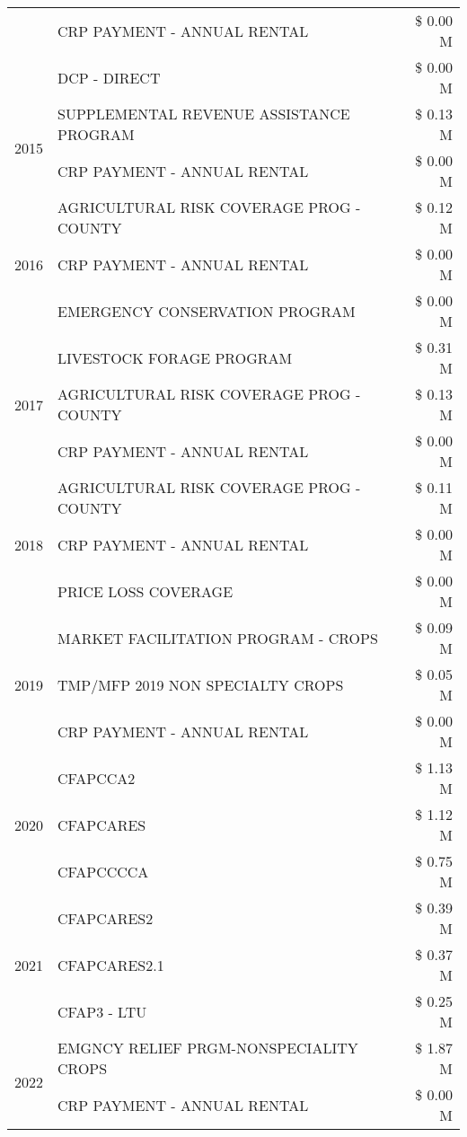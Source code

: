 \begin{tabular}{llr}
 & CRP PAYMENT - ANNUAL RENTAL & \$ 0.00 M \\
 & DCP - DIRECT & \$ 0.00 M \\
\cline{1-3}
\multirow[t]{2}{*}{2015} & SUPPLEMENTAL REVENUE ASSISTANCE PROGRAM & \$ 0.13 M \\
 & CRP PAYMENT - ANNUAL RENTAL & \$ 0.00 M \\
\cline{1-3}
\multirow[t]{3}{*}{2016} & AGRICULTURAL RISK COVERAGE PROG - COUNTY & \$ 0.12 M \\
 & CRP PAYMENT - ANNUAL RENTAL & \$ 0.00 M \\
 & EMERGENCY CONSERVATION PROGRAM & \$ 0.00 M \\
\cline{1-3}
\multirow[t]{3}{*}{2017} & LIVESTOCK FORAGE PROGRAM & \$ 0.31 M \\
 & AGRICULTURAL RISK COVERAGE PROG - COUNTY & \$ 0.13 M \\
 & CRP PAYMENT - ANNUAL RENTAL & \$ 0.00 M \\
\cline{1-3}
\multirow[t]{3}{*}{2018} & AGRICULTURAL RISK COVERAGE PROG - COUNTY & \$ 0.11 M \\
 & CRP PAYMENT - ANNUAL RENTAL & \$ 0.00 M \\
 & PRICE LOSS COVERAGE & \$ 0.00 M \\
\cline{1-3}
\multirow[t]{3}{*}{2019} & MARKET FACILITATION PROGRAM - CROPS & \$ 0.09 M \\
 & TMP/MFP 2019 NON SPECIALTY CROPS & \$ 0.05 M \\
 & CRP PAYMENT - ANNUAL RENTAL & \$ 0.00 M \\
\cline{1-3}
\multirow[t]{3}{*}{2020} & CFAPCCA2 & \$ 1.13 M \\
 & CFAPCARES & \$ 1.12 M \\
 & CFAPCCCCA & \$ 0.75 M \\
\cline{1-3}
\multirow[t]{3}{*}{2021} & CFAPCARES2 & \$ 0.39 M \\
 & CFAPCARES2.1 & \$ 0.37 M \\
 & CFAP3 - LTU & \$ 0.25 M \\
\cline{1-3}
\multirow[t]{2}{*}{2022} & EMGNCY RELIEF PRGM-NONSPECIALITY CROPS & \$ 1.87 M \\
 & CRP PAYMENT - ANNUAL RENTAL & \$ 0.00 M \\
\cline{1-3}
\bottomrule
\end{tabular}
